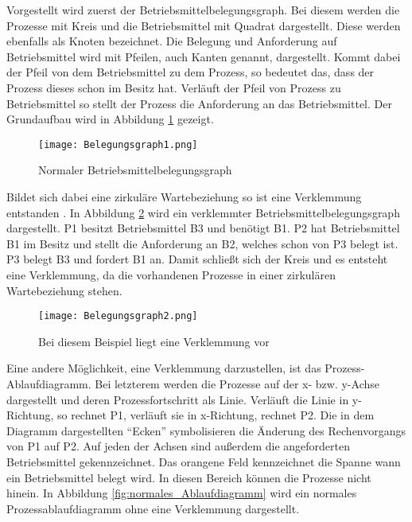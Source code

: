 Vorgestellt wird zuerst der Betriebsmittelbelegungsgraph. Bei diesem werden die Prozesse mit Kreis und die Betriebsmittel mit Quadrat dargestellt. Diese werden ebenfalls als Knoten bezeichnet. Die Belegung und Anforderung auf Betriebsmittel wird mit Pfeilen, auch Kanten genannt, dargestellt. Kommt dabei der Pfeil von dem Betriebsmittel zu dem Prozess, so bedeutet das, dass der Prozess dieses schon im Besitz hat. Verläuft der Pfeil von Prozess zu Betriebsmittel so stellt der Prozess die Anforderung an das Betriebsmittel. Der Grundaufbau wird in Abbildung \ref{fig:normaler_betriebsmittelbelegungsgraph} gezeigt.

\begin{figure}[h]
\caption{Normaler Betriebsmittelbelegungsgraph}
\label{fig:normaler_betriebsmittelbelegungsgraph}
\centering
\texttt{[image: Belegungsgraph1.png]}
\end{figure}

Bildet sich dabei eine zirkuläre Wartebeziehung so ist eine Verklemmung entstanden \parencite[vgl.][S. 197]{baun2017}.  In Abbildung \ref{fig:verklemmter_betriebsmittelbelegungsgraph} wird ein verklemmter Betriebsmittelbelegungsgraph dargestellt.
P1 besitzt Betriebsmittel B3 und benötigt B1. P2 hat Betriebsmittel B1 im Besitz und stellt die Anforderung an B2, welches schon von P3 belegt ist. P3 belegt B3 und fordert B1 an. Damit schließt sich der Kreis und es entsteht eine Verklemmung, da die vorhandenen Prozesse in einer zirkulären Wartebeziehung stehen.

\begin{figure}[H]
\caption{Bei diesem Beispiel liegt eine Verklemmung vor}
\label{fig:verklemmter_betriebsmittelbelegungsgraph}
\centering
\texttt{[image: Belegungsgraph2.png]}
\end{figure}

Eine andere Möglichkeit, eine Verklemmung darzustellen, ist das Prozess-Ablaufdiagramm. Bei letzterem werden die Prozesse auf der x- bzw. y-Achse dargestellt und deren Prozessfortschritt als Linie. Verläuft die Linie in y-Richtung, so rechnet P1, verläuft sie in x-Richtung, rechnet P2. Die in dem Diagramm dargestellten ``Ecken'' symbolisieren die Änderung des Rechenvorgangs von P1 auf P2. Auf jeden der Achsen sind außerdem die angeforderten Betriebsmittel gekennzeichnet. Das orangene Feld kennzeichnet die Spanne wann ein Betriebsmittel belegt wird. In diesen Bereich können die Prozesse nicht hinein.
In Abbildung \ref{fig:normales_Ablaufdiagramm} wird ein normales Prozessablaufdiagramm ohne eine Verklemmung dargestellt.

